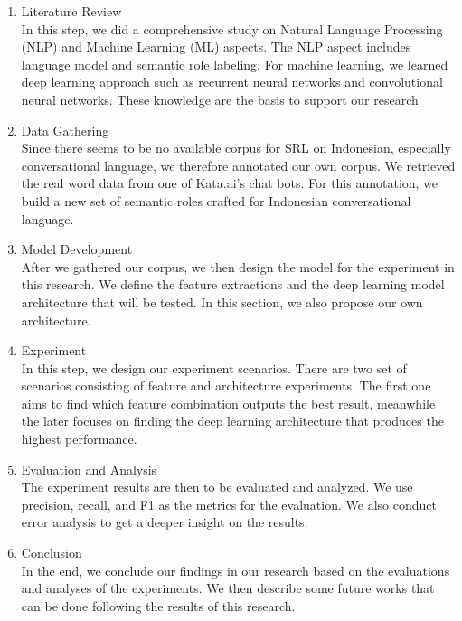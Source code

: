 \begin{enumerate}
	\item Literature Review\\
	In this step, we did a comprehensive study on Natural Language Processing (NLP) and Machine Learning (ML) aspects. The NLP aspect includes language model and semantic role labeling. For machine learning, we learned deep learning approach such as recurrent neural networks and convolutional neural networks. These knowledge are the basis to support our research
	
	\item Data Gathering\\
	Since there seems to be no available corpus for SRL on Indonesian, especially conversational language, we therefore annotated our own corpus. We retrieved the real word data from one of Kata.ai's chat bots. For this annotation, we build a new set of semantic roles crafted for Indonesian conversational language.
	
	\item Model Development\\
	After we gathered our corpus, we then design the model for the experiment in this research. We define the feature extractions and the deep learning model architecture that will be tested. In this section, we also propose our own architecture.
		
	\item Experiment \\
	In this step, we design our experiment scenarios. There are two set of scenarios consisting of feature and architecture experiments. The first one aims to find which feature combination outputs the best result, meanwhile the later focuses on finding the deep learning architecture that produces the highest performance.
	
	\item Evaluation and Analysis \\
	The experiment results are then to be evaluated and analyzed. We use precision, recall, and F1 as the metrics for the evaluation. We also conduct error analysis to get a deeper insight on the results.
	
	\item Conclusion \\
	In the end, we conclude our findings in our research based on the evaluations and analyses of the experiments. We then describe some future works that can be done following the results of this research.
\end{enumerate}

